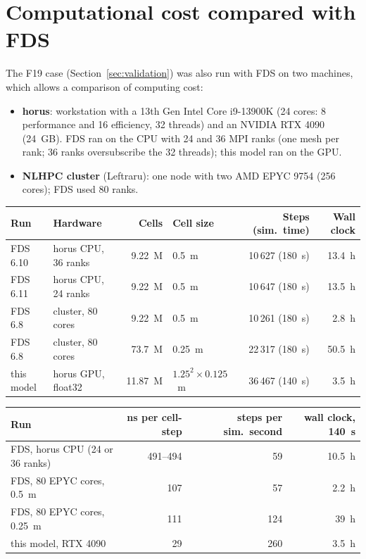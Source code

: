 \documentclass[11pt,a4paper]{article}
\begin{document}
\section{Computational cost compared with FDS}\label{app:cost}
The F19 case (Section~\ref{sec:validation}) was also run with FDS on two machines, which allows a comparison
of computing cost:
\begin{itemize}
  \item \textbf{horus}: workstation with a 13th Gen Intel Core i9-13900K (24 cores: 8 performance and 16
        efficiency, 32 threads) and an NVIDIA RTX 4090 (24~GB). FDS ran on the CPU with 24 and 36 MPI ranks
        (one mesh per rank; 36 ranks oversubscribe the 32 threads); this model ran on the GPU.
  \item \textbf{NLHPC cluster} (Leftraru): one node with two AMD EPYC 9754 (256 cores); FDS used 80 ranks.
\end{itemize}

\begin{center}
\small
\begin{tabular}{llrlrr}
\toprule
Run & Hardware & Cells & Cell size & Steps (sim.\ time) & Wall clock \\
\midrule
FDS 6.10 & horus CPU, 36 ranks & 9.22~M & 0.5~m & 10\,627 (180~s) & 13.4~h \\
FDS 6.11 & horus CPU, 24 ranks & 9.22~M & 0.5~m & 10\,647 (180~s) & 13.5~h \\
FDS 6.8 & cluster, 80 cores & 9.22~M & 0.5~m & 10\,261 (180~s) & 2.8~h \\
FDS 6.8 & cluster, 80 cores & 73.7~M & 0.25~m & 22\,317 (180~s) & 50.5~h \\
this model & horus GPU, float32 & 11.87~M & $1.25^2\times0.125$~m & 36\,467 (140~s) & 3.5~h \\
\bottomrule
\end{tabular}
\end{center}

\begin{center}
\small
\begin{tabular}{lrrr}
\toprule
Run & ns per cell-step & steps per sim.\ second & wall clock, 140~s \\
\midrule
FDS, horus CPU (24 or 36 ranks) & 491--494 & 59 & 10.5~h \\
FDS, 80 EPYC cores, 0.5~m & 107 & 57 & 2.2~h \\
FDS, 80 EPYC cores, 0.25~m & 111 & 124 & 39~h \\
this model, RTX 4090 & 29 & 260 & 3.5~h \\
\bottomrule
\end{tabular}
\end{center}
\end{document}
